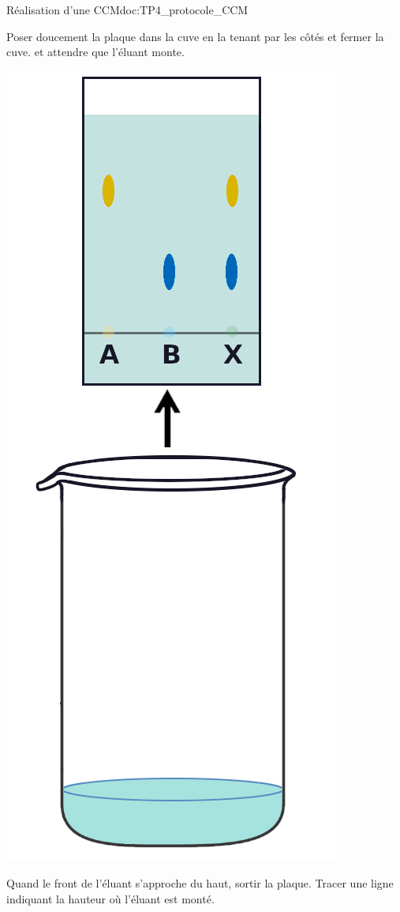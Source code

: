 \begin{doc}{Réalisation d'une CCM}{doc:TP4_protocole_CCM}
\begin{multicols}{2}
\begin{center}
      Poser doucement la plaque dans la cuve en la tenant par les côtés et fermer la cuve.
       et attendre que l'éluant monte.
    \end{center}

    \begin{center}
      \includegraphics[height=0.25\textheight]{images/chimie/CCM/CCM_etapes_retrait}
      
      Quand le front de l'éluant s'approche du haut, sortir la plaque.
      Tracer une ligne indiquant la hauteur où l'éluant est monté.
    \end{center}
  \end{multicols}
\end{doc}


